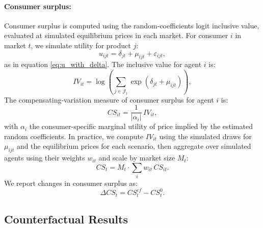 \documentclass[11pt]{article}
\begin{document}
\paragraph{Consumer surplus:}
Consumer surplus is computed using the random-coefficients logit inclusive value, evaluated at simulated equilibrium prices in each market. For consumer \(i\) in market \(t\), we simulate utility for product \(j\):
\begin{equation}
u_{ijt} = \delta_{jt} + \mu_{ijt} + \varepsilon_{ijt},
\end{equation}
as in equation \ref{eq:u_with_delta}. The inclusive value for agent \(i\) is:
\begin{equation}
IV_{it} = \log \left(\sum_{j \in \mathcal{J}_t} \exp(\delta_{jt} + \mu_{ijt}) \right),
\end{equation}
The compensating-variation measure of consumer surplus for agent \(i\) is:
\begin{equation}
CS_{it} = \frac{1}{|\alpha_i|} \, IV_{it},
\end{equation}
with \(\alpha_i\) the consumer-specific marginal utility of price implied by the estimated random coefficients. In practice, we compute \(IV_{it}\) using the simulated draws for \(\mu_{ijt}\) and the equilibrium prices for each scenario, then aggregate over simulated agents using their weights \(w_{it}\) and scale by market size $M_t$:
\begin{equation}
CS_t = M_t \cdot\sum_{i} w_{it} \, CS_{it}.
\end{equation}
We report changes in consumer surplus as:
\begin{equation}
\Delta CS_t = CS^{cf}_t - CS^{0}_t.
\end{equation}

\subsection{Counterfactual Results}


\end{document}
